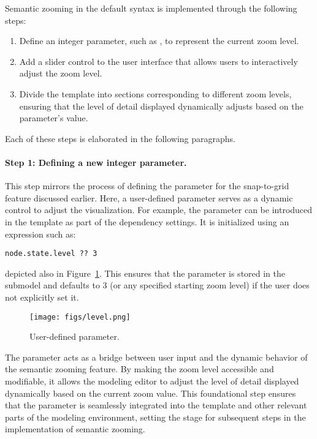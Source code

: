 Semantic zooming in the default syntax is implemented through the following steps:  

\begin{enumerate}  
\item Define an integer parameter, such as , to represent the current zoom level.  
\item Add a slider control to the user interface that allows users to interactively adjust the zoom level.  
\item Divide the template into sections corresponding to different zoom levels, ensuring that the level of detail displayed dynamically adjusts based on the parameter's value.  
\end{enumerate}  
Each of these steps is elaborated in the following paragraphs.

\paragraph{Step 1: Defining a new integer parameter.} This step mirrors the process of defining the parameter  for the snap-to-grid feature discussed earlier. Here, a user-defined parameter serves as a dynamic control to adjust the visualization. For example, the  parameter can be introduced in the template as part of the dependency settings. It is initialized using an expression such as:  

\begin{lstlisting}[language=JSX-template]  
node.state.level ?? 3
\end{lstlisting}  
depicted also in Figure~\ref{fig:level}. This ensures that the parameter is stored in the  submodel and defaults to 3 (or any specified starting zoom level) if the user does not explicitly set it.  

\begin{figure}  
    \centering  
\texttt{[image: figs/level.png]}  
    \caption{User-defined  parameter.}  
    \label{fig:level}  
\end{figure}  

The parameter  acts as a bridge between user input and the dynamic behavior of the semantic zooming feature. By making the zoom level accessible and modifiable, it allows the modeling editor to adjust the level of detail displayed dynamically based on the current zoom value. This foundational step ensures that the parameter is seamlessly integrated into the template and other relevant parts of the modeling environment, setting the stage for subsequent steps in the implementation of semantic zooming.  

